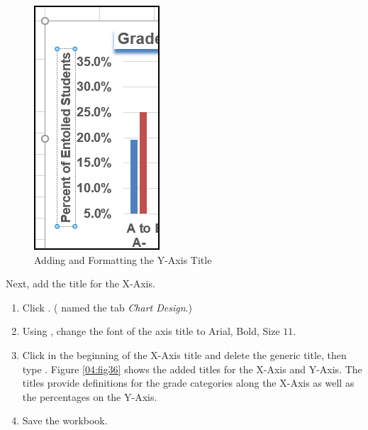 \begin{figure}[H]
	\centering
	\includegraphics[width=\maxwidth{.95\linewidth}]{gfx/ch04_fig35}
	\caption{Adding and Formatting the Y-Axis Title}
	\label{04:fig35}
\end{figure}

Next, add the title for the X-Axis.

\begin{enumbox}
	\begin{enumerate}
		\item Click . ( named the tab \textit{Chart Design}.)
		\item Using , change the font of the axis title to Arial, Bold, Size $ 11 $. 
		\item Click in the beginning of the X-Axis title and delete the generic title, then type . Figure \ref{04:fig36} shows the added titles for the X-Axis and Y-Axis. The titles provide definitions for the grade categories along the X-Axis as well as the percentages on the Y-Axis.
		\item Save the  workbook.
	\end{enumerate}
\end{enumbox}
	
